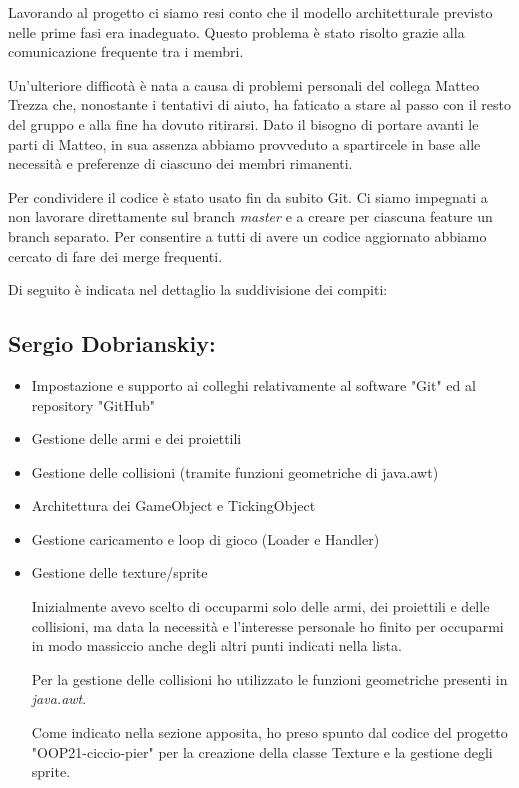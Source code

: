 \documentclass[a4paper,12pt]{report}
\begin{document}
Lavorando al progetto ci siamo resi conto che il modello architetturale previsto nelle prime fasi era inadeguato. Questo problema è stato risolto grazie alla comunicazione frequente tra i membri. 

Un'ulteriore difficotà è nata a causa di problemi personali del collega Matteo Trezza che, nonostante i tentativi di aiuto, ha faticato a stare al passo con il resto del gruppo e alla fine ha dovuto ritirarsi. Dato il bisogno di portare avanti le parti di Matteo, in sua assenza abbiamo provveduto a spartircele in base alle necessità e preferenze di ciascuno dei membri rimanenti.

Per condividere il codice è stato usato fin da subito Git. Ci siamo impegnati a non lavorare direttamente sul branch \textit{master} e a creare per ciascuna feature un branch separato. Per consentire a tutti di avere un codice aggiornato abbiamo cercato di fare dei merge frequenti.

Di seguito è indicata nel dettaglio la suddivisione dei compiti:

\subsection*{Sergio Dobrianskiy:}
\begin{itemize}
	\item Impostazione e supporto ai colleghi relativamente al software "Git" ed al repository "GitHub"
	\item Gestione delle armi e dei proiettili
	\item Gestione delle collisioni (tramite funzioni geometriche di java.awt)
	\item Architettura dei GameObject e TickingObject
	\item Gestione caricamento e loop di gioco (Loader e Handler)
	\item Gestione delle texture/sprite
	
	Inizialmente avevo scelto di occuparmi solo delle armi, dei proiettili e delle collisioni, ma data la necessità e l'interesse personale ho finito per occuparmi in modo massiccio anche degli altri punti indicati nella lista. 
	
	Per la gestione delle collisioni ho utilizzato le funzioni geometriche presenti in \textit{java.awt}.
	
	Come indicato nella sezione apposita, ho preso spunto dal codice del progetto "OOP21-ciccio-pier" per la creazione della classe Texture e la gestione degli sprite.
\end{itemize}
\end{document}
